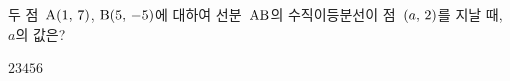 두 점~$\mathrm{A}(1,\mkern3mu 7)$, $\mathrm{B}(5,\mkern3mu -5)$에 대하여 선분~$\mathrm{AB}$의 수직이등분선이 점~$(a,\mkern3mu 2)$를 지날 때, $a$의 값은?
\begin{choices32}{$2$}{$3$}{$4$}{$5$}{$6$}\end{choices32}
